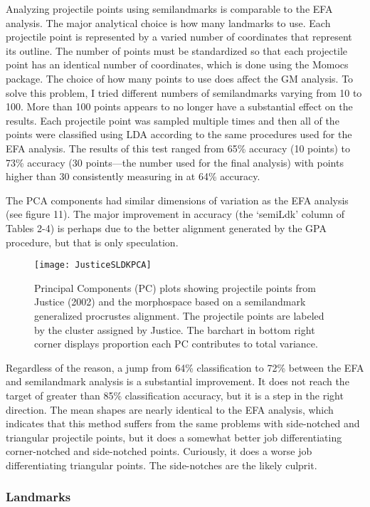 \documentclass[PCJ,Unicode,screen,mode=plain]{cedram}
\begin{document}
Analyzing projectile points using semilandmarks is comparable to the EFA analysis. The major analytical choice is how many landmarks to use. Each projectile point is represented by a varied number of coordinates that represent its outline. The number of points must be standardized so that each projectile point has an identical number of coordinates, which is done using the Momocs package. The choice of how many points to use does affect the GM analysis. To solve this problem, I tried different numbers of semilandmarks varying from 10 to 100. More than 100 points appears to no longer have a substantial effect on the results. Each projectile point was sampled multiple times and then all of the points were classified using LDA according to the same procedures used for the EFA analysis. The results of this test ranged from 65\% accuracy (10 points) to 73\% accuracy (30 points---the number used for the final analysis) with points higher than 30 consistently measuring in at 64\% accuracy.

The PCA components had similar dimensions of variation as the EFA analysis (see figure 11). The major improvement in accuracy (the `semiLdk' column of Tables 2-4) is perhaps due to the better alignment generated by the GPA procedure, but that is only speculation.

\begin{figure}
\texttt{[image: JusticeSLDKPCA]} \caption{Principal Components (PC) plots showing projectile points from Justice (2002) and the morphospace based on a semilandmark generalized procrustes alignment. The projectile points are labeled by the cluster assigned by Justice. The barchart in bottom right corner displays proportion each PC contributes to total variance.}\label{fig:JusticeSLDKPCA}
\end{figure}

Regardless of the reason, a jump from 64\% classification to 72\% between the EFA and semilandmark analysis is a substantial improvement. It does not reach the target of greater than 85\% classification accuracy, but it is a step in the right direction. The mean shapes are nearly identical to the EFA analysis, which indicates that this method suffers from the same problems with side-notched and triangular projectile points, but it does a somewhat better job differentiating corner-notched and side-notched points. Curiously, it does a worse job differentiating triangular points. The side-notches are the likely culprit.

\subsubsection{Landmarks}
\end{document}
